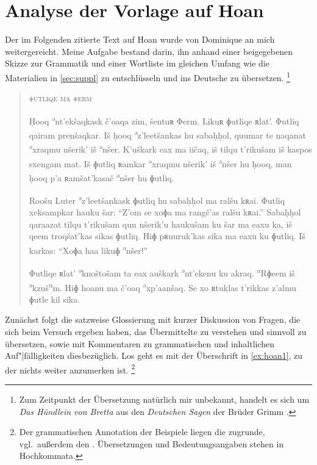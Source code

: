 \documentclass[
	12pt,
	ngerman,
]{scrartcl}
\newcommand{\tit}[1]{\textit{#1}} %
\newcommand{\tsup}[1]{\textsuperscript{#1}} %
\begin{document}

\section{Analyse der Vorlage auf Hoan}
\label{sec:hoanalys}

Der im Folgenden zitierte Text auf Hoan wurde von Dominique an mich
weitergereicht. Meine Aufgabe bestand darin, ihn anhand einer beigegebenen
Skizze zur Grammatik und einer Wortliste im gleichen Umfang wie die Materialien
in \cref{sec:suppl} zu entschlüsseln und ins Deutsche zu übersetzen.%
%
	\footnote{Zum Zeitpunkt der Übersetzung natürlich mir unbekannt, handelt es
	sich um \tit{Das Hündlein von Bretta} aus den \tit{Deutschen Sagen} der
	Brüder Grimm \autocite[154--155]{grimm:dtsagen}.}

\begin{quote}
\textsc{\MakeLowercase{Φutliqe ma Φerm}}

Ḥooq \tsup{ə}nt’ekšaqkask č'oaqa zim, šentuʀ Φerm. Likuʀ ɸutliqe ʀlat'. Φutliq
qairam prenšaqkar. Iš ḥooq \tsup{ə}z'leetšankas hu sabaḥḥol, quumar te naqanat
\tsup{ə}xraqmu nšerik' iš \tsup{ə}nšer. K'uškark eax ma iičaq, iš tilqu
t'rikušam iš kaspos sxengam mat. Iš ɸutliq ʀamkar \tsup{ə}xraqmu nšerik' iš
\tsup{ə}nšer hu ḥooq, man ḥooq p'a ʀamšat'kasač \tsup{ə}nšer hu ɸutliq.

Roošu Luter \tsup{ə}z'leetšankask ɸutliq hu sabaḥḥol ma ralšu kʀai. Φutliq
xeksampkar hauku šar: \enquote{Z'om se xoɸa ma rangč'as ralšu kʀai.} Sabaḥḥol
qaraazat tilqu t'rikušam qun nšerik'u haukušam ku šar ma eaxu ka, iš qeem
troqšat'kas sikas ɸutliq. Hiɸ pʀuuruk'kas sika ma eaxu ku ɸutliq. Iš karkas:
\enquote{Xoɸa haa likuɸ \tsup{ə}nšer!}

Φutliqe ʀlat' \tsup{ə}knoštošam ta eax auškark \tsup{ə}nt'ekenu ku akraq.
\tsup{a}Rɸeem iš \tsup{ə}kzuš\tsup{u}m. Hiɸ hoanu ma č'oaq \tsup{ə}xp'aanšaq.
Se xo ʀtuklas t'rikkas z'almu ɸutle kil sika.
\end{quote}

Zunächst folgt die satzweise Glossierung mit kurzer Diskussion von Fragen, die
sich beim Versuch ergeben haben, das Übermittelte zu verstehen und sinnvoll zu
übersetzen, sowie mit Kommentaren zu grammatischen und inhaltlichen
Auf"|fälligkeiten diesbezüglich. Los geht es mit der Überschrift in
\cref{ex:hoan1}, zu der nichts weiter anzumerken ist.%
%
	\footnote{Der grammatischen Annotation der Beispiele liegen die
	\tit{} \autocite{lgr} zugrunde, vgl.~außerdem den
	 \tit{}. Übersetzungen und
	Bedeutungsangaben stehen in Hochkommata.}
\end{document}
